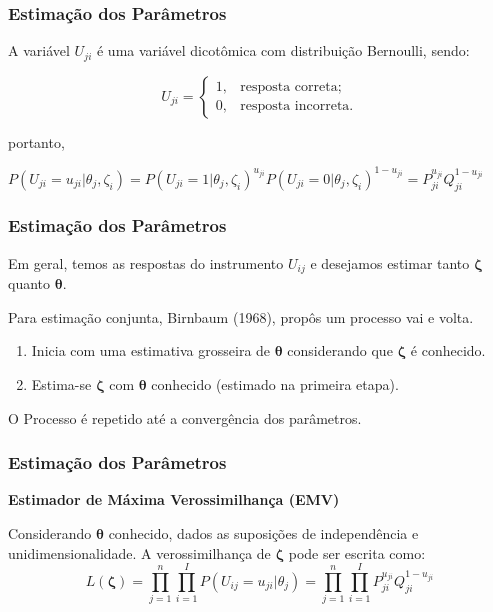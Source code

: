 \documentclass{beamer}
\begin{document}
	

	\begin{frame}
		
		\frametitle{Estimação dos Parâmetros }
		
		A variável $U_{ji}$ é uma variável dicotômica com distribuição Bernoulli, sendo:
		
		\[U_{ji} =    \begin{cases}
			
			1, & \mbox{resposta correta;}  \\
			
			0, & \mbox{resposta incorreta.}
			
		\end{cases}
		\]
		
		portanto,  
		
		$ \label{eq:bern}
			P(U_{ji} = u_{ji}|\theta_j, \zeta_i) = P(U_{ji} = 1|\theta_j, \zeta_i)^{u_{ji}}
			P(U_{ji} = 0|\theta_j, \zeta_i)^{1 - u_{ji}} = P_{ji}^{u_{ji}}Q_{ji}^{1-u_{ji}}
		$
	
	\end{frame}
	
	\begin{frame}
		
		\frametitle{Estimação dos Parâmetros }
		
		Em geral, temos as respostas do instrumento $U_{ij}$ e desejamos estimar tanto $\boldsymbol{\zeta}$ quanto $\boldsymbol{\theta}$.
		
		Para estimação conjunta, Birnbaum (1968), propôs um processo vai e volta.\newline
		
		\begin{enumerate}
			\item Inicia com uma estimativa grosseira de $\boldsymbol{\theta}$ considerando que $\boldsymbol{\zeta}$ é conhecido.
			\item Estima-se $\boldsymbol{\zeta}$ com $\boldsymbol{\theta}$ conhecido (estimado na primeira etapa).\newline 
		\end{enumerate} 
		
		O Processo é repetido até a convergência dos parâmetros.
		
	\end{frame}
	
	\begin{frame}
		
		\frametitle{Estimação dos Parâmetros }
		
		\begin{center}
			\textbf{Estimador de Máxima Verossimilhança (EMV)}
		\end{center}
		
		Considerando  $ \boldsymbol{\theta} $ conhecido, dados as suposições de independência e unidimensionalidade. A verossimilhança de  $ \boldsymbol{\zeta} $ pode ser escrita como:
		\[
		L(\boldsymbol{\zeta}) =  \prod_{j=1}^{n}\prod_{i=1}^{I}P(U_{ij} = u_{ji}|\theta_j) = \prod_{j=1}^{n}\prod_{i=1}^{I}P_{ji}^{u_{ji}}Q_{ji}^{1-u_{ji}}
		\]
			
   \end{frame}
	
\end{document}
